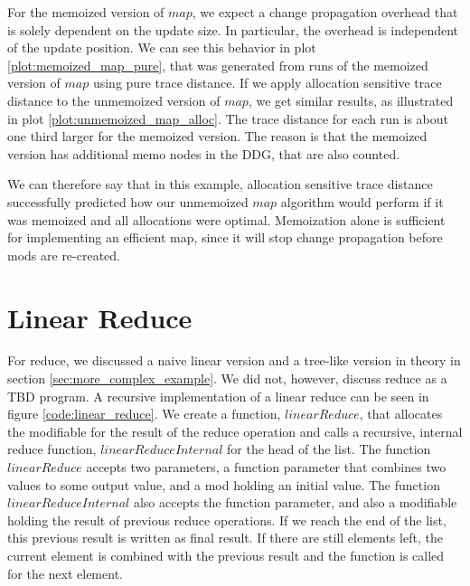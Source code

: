 For the memoized version of $map$, we expect a change propagation overhead that is solely dependent on the update size. In particular, the overhead is independent of the update position. We can see this behavior in plot \ref{plot:memoized_map_pure}, that was generated from runs of the memoized version of $map$ using pure trace distance. If we apply allocation sensitive trace distance to the unmemoized version of $map$, we get similar results, as illustrated in plot \ref{plot:unmemoized_map_alloc}. The trace distance for each run is about one third larger for the memoized version. The reason is that the memoized version has additional memo nodes in the DDG, that are also counted. 

We can therefore say that in this example, allocation sensitive trace distance successfully predicted how our unmemoized $map$ algorithm would perform if it was memoized and all allocations were optimal. Memoization alone is sufficient for implementing an efficient map, since it will stop change propagation before mods are re-created. 

\section{Linear Reduce}

For reduce, we discussed a naive linear version and a tree-like version in theory in section \ref{sec:more_complex_example}. We did not, however, discuss reduce as a TBD program. A recursive implementation of a linear reduce can be seen in figure \ref{code:linear_reduce}. We create a function, $linearReduce$, that allocates the modifiable for the result of the reduce operation and calls a recursive, internal reduce function, $linearReduceInternal$ for the head of the list. The function $linearReduce$ accepts two parameters, a function parameter that combines two values to some output value, and a mod holding an initial value. The function $linearReduceInternal$ also accepts the function parameter, and also a modifiable holding the result of previous reduce operations. If we reach the end of the list, this previous result is written as final result. If there are still elements left, the current element is combined with the previous result and the function is called for the next element. 


